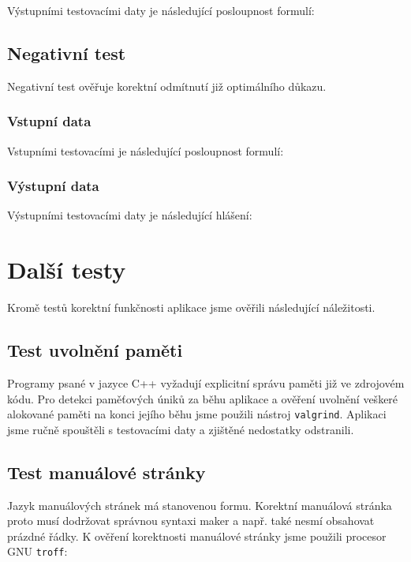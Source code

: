 \documentclass[thesis=B,czech,hidelinks]{thesis}[2012/06/26]
\begin{document}
Výstupními testovacími daty je následující posloupnost formulí:



\subsection{Negativní test}

Negativní test ověřuje korektní odmítnutí již optimálního důkazu.

\subsubsection{Vstupní data}

Vstupními testovacími je následující posloupnost formulí:



\subsubsection{Výstupní data}

Výstupními testovacími daty je následující hlášení:



\section{Další testy}

Kromě testů korektní funkčnosti aplikace jsme ověřili následující náležitosti.

\subsection{Test uvolnění paměti}

Programy psané v jazyce C++ vyžadují explicitní správu paměti již ve zdrojovém kódu. Pro detekci paměťových úniků za běhu aplikace a ověření uvolnění veškeré alokované paměti na konci jejího běhu jsme použili nástroj \texttt{valgrind}. Aplikaci jsme ručně spouštěli s testovacími daty a zjištěné nedostatky odstranili.

\subsection{Test manuálové stránky}

Jazyk manuálových stránek má stanovenou formu. Korektní manuálová stránka proto musí dodržovat správnou syntaxi maker a např. také nesmí obsahovat prázdné řádky. K ověření korektnosti manuálové stránky jsme použili procesor GNU \texttt{troff}:
\end{document}
